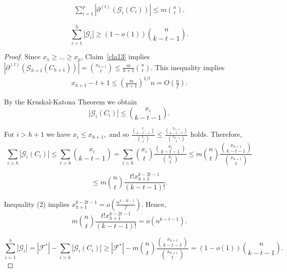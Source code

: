 \documentclass[10pt,a4paper]{amsart}
\newcommand{\ff}{\mathcal{F}}
\begin{document}
\begin{Claim}\label{cla13}
    \begin{align}
       \sum_{i=1}^p |\partial^{(t)}(\mathcal{G}_i(C_i))| \leqslant m \binom{n}{t}.
    \end{align}  
\end{Claim}

\begin{Claim}\label{cla14}
    $$\sum_{i=1}^h |\mathcal{G}_i| \geqslant (1 - o(1) )  \binom{n}{k-t-1}.$$
\end{Claim}

\begin{proof}

Since $x_1 \geqslant \ldots \geqslant x_p$, Claim~\ref{cla13} implies $ |\partial^{(t)}(\mathcal{G}_{h+1}(C_{h+1}))|  =  \binom{x_{h+1}}{t}  \leqslant \frac{m}{h+1} \binom{n}{t}.$ This inequality implies 
\begin{align}
x_{h+1} - t + 1 \leqslant\left(\frac{m}{h+1}\right)^{1/t} n = O\left(\frac{n}{f}\right).
\end{align}

By the Kruskal-Katona Theorem we obtain
$$|\mathcal{G}_i(C_i)| \leqslant\binom{x_i}{k-t-1}.$$

For $i > h+1$ we have $x_i \leqslant x_{h+1},$ and so $ \frac{\binom{x_{i}}{k-t-1}}{\binom{x_{i}}{t}} \leqslant \frac{\binom{x_{h+1}}{k-t-1}}{\binom{x_{h+1}}{t}}$ holds. Therefore, 
$$\sum_{i>h} |\mathcal{G}_i(C_i)| \leqslant\sum_{i>h} \binom{x_i}{k-t-1} = \sum_{i>h} \binom{x_i}{t} \frac{\binom{x_i}{k-t-1}}{\binom{x_i}{t}} \leqslant m \binom{n}{t} \frac{\binom{x_{h+1}}{k-t-1}}{\binom{x_{h+1}}{t}}$$

$$\leqslant m \binom{n}{t} \frac{t!x_{h+1}^{k-2t-1}}{(k-t-1)!}.$$

Inequality (2) implies $x_{h+1}^{k-2t-1} = o(\frac{n^{k-2t-1}}{f}).$ Hence,
$$ m \binom{n}{t} \frac{t!x_{h+1}^{k-2t-1}}{(k-t-1)!} = o(n^{k-t-1}).$$

$$\sum_{i=1}^h|\mathcal{G}_i| = |\ff^*| - \sum_{i>h} |\mathcal{G}_i(C_i)| \geqslant |\ff^*| - m \binom{n}{t} \frac{\binom{x_{h+1}}{k-t-1}}{\binom{x_{h+1}}{t}} = (1-o(1))\binom{n}{k-t-1}.$$

\end{proof}
\end{document}
